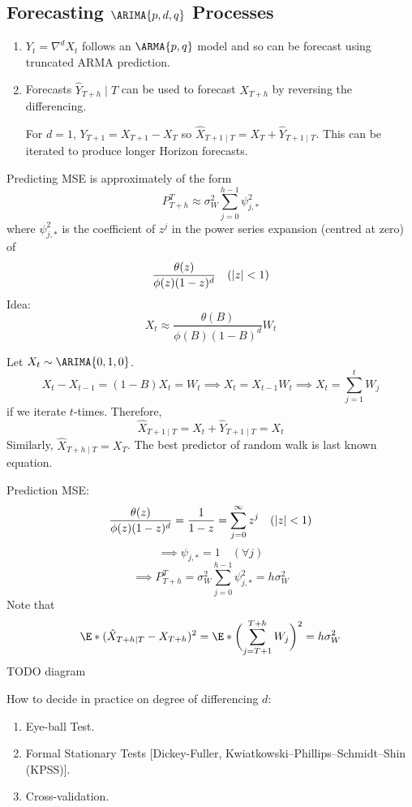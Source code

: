 \subsection*{Forecasting $ \ARIMA{p,d,q} $ Processes}
\begin{enumerate}[(1)]
    \item $ Y_t=\nabla^d X_t $ follows an $ \ARMA{p,q} $ model
          and so can be forecast using truncated ARMA prediction.
    \item Forecasts $ \hat{Y}_{T+h}\mid T $ can be used to forecast $ X_{T+h} $
          by reversing the differencing.
          \begin{Example}{}{}
              For $ d=1 $, $ Y_{T+1}=X_{T+1}-X_{T} $ so $ \hat{X}_{T+1\mid T}=X_T+\hat{Y}_{T+1\mid T} $.
              This can be iterated to produce longer Horizon forecasts.
          \end{Example}
\end{enumerate}
Predicting MSE is approximately of the form
\[ P_{T+h}^T\approx \sigma_W^2 \sum_{j=0}^{h-1} \psi^2_{j,*} \]
where $  \psi^2_{j,*} $ is the coefficient of $ z^j $ in the
power series expansion (centred at zero) of
\[ \frac{\theta(z)}{\phi(z)(1-z)^d} \quad(\lvert z\rvert<1) \]
Idea:
\[ X_t \approx \frac{\theta(B)}{\phi(B)(1-B)^d}W_t  \]
\begin{Example}{}{}
    Let $ X_t \sim \ARIMA{0,1,0} $.
    \[ X_t-X_{t-1}=(1-B)X_t=W_t\implies X_t=X_{t-1}W_t\implies X_t=\sum_{j=1}^{t} W_j \]
    if we iterate $ t $-times. Therefore,
    \[ \hat{X}_{T+1\mid T}=X_t+\hat{Y}_{T+1\mid T}=X_t \]
    Similarly, $ \hat{X}_{T+h\mid T}=X_T $. The best predictor of random
    walk is last known equation.

    Prediction MSE\@: \[ \frac{\theta(z)}{\phi(z)(1-z)^d}=\frac{1}{1-z} =\sum_{j=0}^{\infty} z^j\quad(\lvert z\rvert<1)  \]
    \[ \implies\psi_{j,*}=1\quad(\forall j) \]
    \[ \implies P_{T+h}^T=\sigma_W^2 \sum_{j=0}^{h-1} \psi_{j,*}^2=h\sigma_W^2 \]
    Note that
    \[ \E*{(\hat{X}_{T+h\mid T}-X_{T+h})^2}=\E*{\biggl(\sum_{j=T+1}^{T+h} W_j\biggr)^2}=h\sigma_W^2 \]
    TODO diagram
\end{Example}
How to decide in practice on degree of differencing $ d $:
\begin{enumerate}[(1)]
    \item Eye-ball Test.
    \item Formal Stationary Tests [Dickey-Fuller, Kwiatkowski–Phillips–Schmidt–Shin (KPSS)].
    \item Cross-validation.
\end{enumerate}
